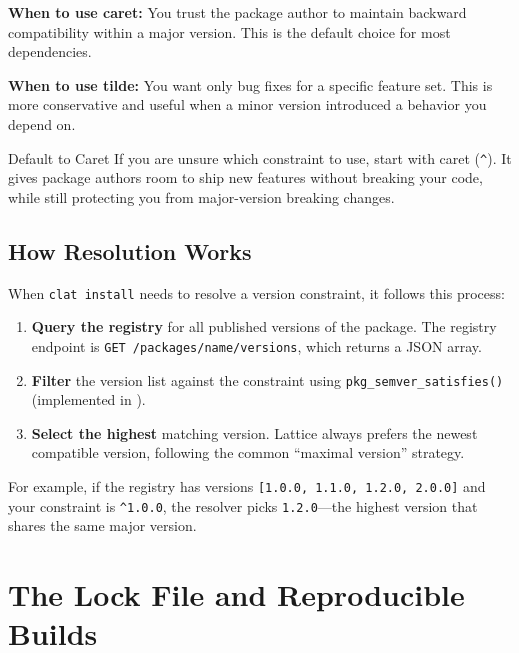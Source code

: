 \textbf{When to use caret:} You trust the package author to maintain backward compatibility within a major version.
This is the default choice for most dependencies.

\textbf{When to use tilde:} You want only bug fixes for a specific feature set.
This is more conservative and useful when a minor version introduced a behavior you depend on.

\begin{tipbox}{Default to Caret}
If you are unsure which constraint to use, start with caret (\texttt{\^{}}).
It gives package authors room to ship new features without breaking your code, while still protecting you from major-version breaking changes.
\end{tipbox}

\subsection{How Resolution Works}\label{subsec:resolution-algorithm}

When \texttt{clat install} needs to resolve a version constraint, it follows this process:

\begin{enumerate}
  \item \textbf{Query the registry} for all published versions of the package.
  The registry endpoint is \texttt{GET /packages/\textlangle{}name\textrangle{}/versions}, which returns a JSON array.

  \item \textbf{Filter} the version list against the constraint using \lstinline|pkg_semver_satisfies()| (implemented in ).

  \item \textbf{Select the highest} matching version.
  Lattice always prefers the newest compatible version, following the common ``maximal version'' strategy.
\end{enumerate}

For example, if the registry has versions \texttt{[1.0.0, 1.1.0, 1.2.0, 2.0.0]} and your constraint is \texttt{\^{}1.0.0}, the resolver picks \texttt{1.2.0}---the highest version that shares the same major version.

\section{The Lock File and Reproducible Builds}\label{sec:lock-file}

